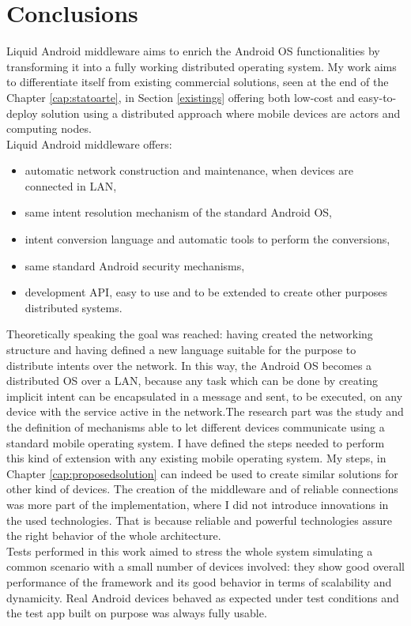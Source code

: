 \section{Conclusions}
Liquid Android middleware aims to enrich the Android OS functionalities by transforming it into a fully working distributed operating system. My work aims to differentiate itself from existing commercial solutions, seen at the end of the Chapter \ref{cap:statoarte}, in Section \ref{existings} offering both low-cost and easy-to-deploy solution using a distributed approach where mobile devices are actors and computing nodes.\\
Liquid Android middleware offers:
\begin{itemize}
	\item automatic network construction and maintenance, when devices are connected in LAN,
	\item same intent resolution mechanism of the standard Android OS,
	\item intent conversion language and automatic tools to perform the conversions,
	\item same standard Android security mechanisms,
	\item development API, easy to use and to be extended to create other purposes distributed systems.
\end{itemize}
Theoretically speaking the goal was reached: having created the networking structure and having defined a new language suitable for the purpose to distribute intents over the network. In this way, the Android OS becomes a distributed OS over a LAN, because any task which can be done by creating implicit intent can be encapsulated in a message and sent, to be executed, on any device with the service active in the network.The research part
was the study and the definition of mechanisms able to let different devices communicate using a standard mobile operating system. I have defined the steps needed to perform this kind of extension with any existing mobile operating system. My steps, in Chapter \ref{cap:proposedsolution} can indeed be used to create similar solutions for other kind of devices. The creation of the middleware and of reliable connections was more part of the implementation, where I did not introduce innovations in the used technologies. That is because reliable and powerful technologies assure the right behavior of the whole architecture.\\
Tests performed in this work aimed to stress the whole system simulating a common scenario with a small number of devices involved: they show good overall performance of the framework and its good behavior in terms of scalability and dynamicity. Real Android devices behaved as expected under test conditions and the test app built on purpose was always fully usable.\\
